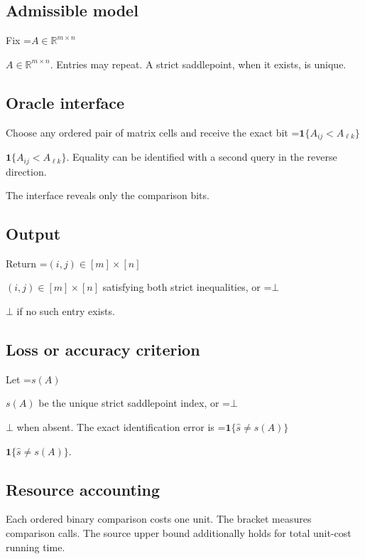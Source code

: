\documentclass[10pt,a4paper]{article}
\newcommand{\AtlasMath}[1]{\par\begingroup\centering\setbox0=\hbox{$\displaystyle #1$}\ifdim\wd0>1.4\linewidth\typeout{ATLAS WIDE FORMULA: \the\wd0}\fi\ifdim\wd0>\linewidth\resizebox{\linewidth}{!}{\box0}\else\box0\fi\par\endgroup}
\newcommand{\AtlasInlineMath}[1]{\begingroup\setbox0=\hbox{$#1$}\ifdim\wd0>.4\linewidth\endgroup\AtlasMath{#1}\else\endgroup$#1$\fi}
\begin{document}
\subsection{Admissible model}


Fix \AtlasInlineMath{A\in\mathbb R^{m\times n}}. Entries may repeat. A strict saddlepoint, when it exists, is unique.



\subsection{Oracle interface}


Choose any ordered pair of matrix cells and receive the exact bit \AtlasInlineMath{\mathbf{1}\{A_{ij}<A_{\ell k}\}}. Equality can be identified with a second query in the reverse direction.



The interface reveals only the comparison bits.



\subsection{Output}


Return \AtlasInlineMath{(i,j)\in[m]\times[n]} satisfying both strict inequalities, or \AtlasInlineMath{\bot} if no such entry exists.



\subsection{Loss or accuracy criterion}


Let \AtlasInlineMath{s(A)} be the unique strict saddlepoint index, or \AtlasInlineMath{\bot} when absent. The exact identification error is \AtlasInlineMath{\mathbf{1}\{\widehat{s}\ne s(A)\}}.



\subsection{Resource accounting}


Each ordered binary comparison costs one unit. The bracket measures comparison calls. The source upper bound additionally holds for total unit-cost running time.
\end{document}
